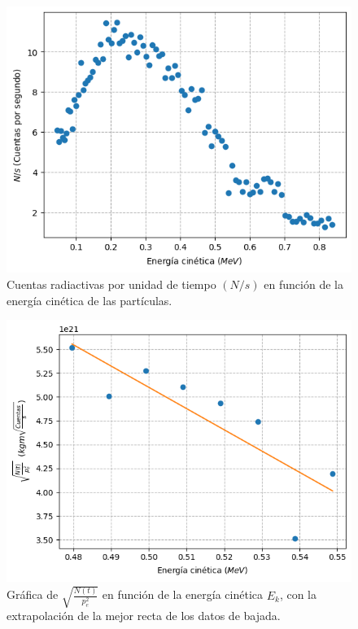 \documentclass[10pt,twocolumns,letterpaper]{article}
\begin{document}
\begin{figure}[h!]
    \centering
    \includegraphics[scale=0.6]{Imagen corregida.png}
    \caption{Cuentas radiactivas por unidad de tiempo $(N/s)$ en función de la energía cinética de las partículas.}
    \label{fig:3}
\end{figure}

\begin{figure}[h!]
    \centering
    \includegraphics[scale=0.55]{Ajuste.png}
    \caption{Gráfica de $\sqrt{\frac{N(t)}{p^2_e}}$ en función de la energía cinética $E_k$, con la extrapolación de la mejor recta de los datos de bajada.}
    \label{fig:4}
\end{figure}
\end{document}
